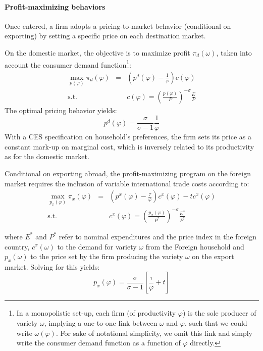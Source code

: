 \documentclass[a4paper,11pt]{article}
\begin{document}
\paragraph{Profit-maximizing behaviors} Once entered, a firm adopts a pricing-to-market behavior (conditional on exporting) by setting a specific price on each destination market.

On the domestic market, the objective is to maximize profit $\pi_d(\omega)$, taken into account the consumer demand function\footnote{In a monopolistic set-up, each firm (of productivity $\varphi$) is the sole producer of variety $\omega$, implying a one-to-one link between $\omega$ and $\varphi$, such that we could write $\omega(\varphi)$. For sake of notational simplicity, we omit this link and simply write the consumer demand function as a function of $\varphi$ directly.}:
\begin{eqnarray*}
\max_{p(\varphi)} \pi_d(\varphi) &=& \left(p^d(\varphi) -\frac{1}{\varphi}  \right)c(\varphi) \\
\text{s.t. }&&c(\varphi) = \left(\frac{p(\varphi)}{P}  \right)^{-\sigma} \frac{E}{P}
\end{eqnarray*}
The optimal pricing behavior yields:
$$p^d(\varphi) = \frac{\sigma}{\sigma-1}\frac{1}{\varphi}$$
With a CES specification on household's preferences, the firm sets its price as a constant mark-up on marginal cost, which is inversely related to its productivity as for the domestic market. \medskip

Conditional on exporting abroad, the profit-maximizing program on the foreign market requires the inclusion of variable international trade costs according to:
\begin{eqnarray*}
\max_{p_x(\varphi)} \pi_x(\varphi) &=& \left(p^x(\varphi) -\frac{\tau}{\varphi}  \right)c^x(\varphi) - tc^x(\varphi) \\
\text{s.t. }&&c^x(\varphi) = \left(\frac{p_x(\varphi)}{P^\ast}  \right)^{-\sigma} \frac{E^\ast}{P^\ast}
\end{eqnarray*}

\noindent where $E^\ast$ and $P^\ast$ refer to nominal expenditures and the price index in the foreign country, $c^x(\omega)$ to the demand for variety $\omega$ from the Foreign household and $p_x(\omega)$ to the price set by the firm producing the variety $\omega$ on the export market. Solving for this yields:
\begin{equation}
p_x(\varphi) = \frac{\sigma}{\sigma-1}\left[\frac{\tau}{\varphi} +t \right] \label{eq:px}
\end{equation}
\end{document}
